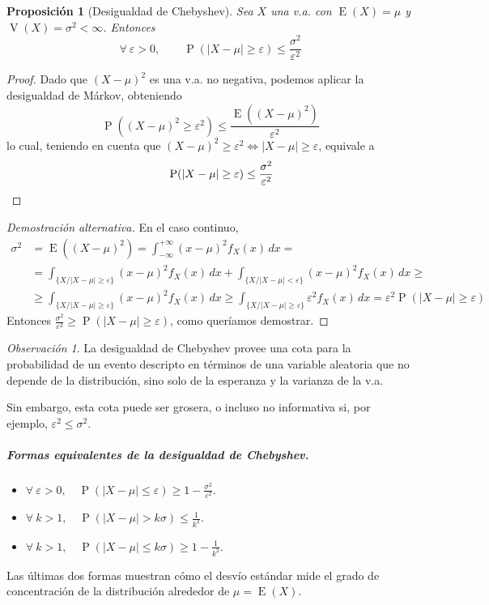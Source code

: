 \documentclass[11pt]{article}
\theoremstyle{plain}
\newtheorem*{pro}{Proposición}
\theoremstyle{definition}
\theoremstyle{remark}
\newtheorem*{obs}{Observación}
\newcommand{\proba}{\ensuremath{\operatorname{P}}}  %
\newcommand{\esp}[0]{\ensuremath{\operatorname{E}}}  %
\newcommand{\var}[0]{\ensuremath{\operatorname{V}}}  %
\newcommand{\foralle}{\ensuremath{\forall \ }}  %
\begin{document}
    \begin{pro}[Desigualdad de Chebyshev]
      Sea $X$ una v.a. con $\esp(X) = \mu$ y $\var(X) = \sigma^2 < \infty$. Entonces
      \[ \foralle \varepsilon > 0, \qquad \proba(\vert X - \mu \vert \geq \varepsilon) \leq \frac{\sigma^2}{\varepsilon^2} \]
    \end{pro}
    \begin{proof}
      Dado que $(X - \mu)^2$ es una v.a. no negativa, podemos aplicar la desigualdad de Márkov, obteniendo
      \[ \proba((X - \mu)^2 \geq \varepsilon^2) \leq \frac{\esp \left((X - \mu)^2 \right)}{\varepsilon^2}\]
      lo cual, teniendo en cuenta que $ (X - \mu)^2 \geq \varepsilon^2 \Leftrightarrow \vert X - \mu \vert \geq \varepsilon $, equivale a
      \[ \qquad \proba(\vert X - \mu \vert \geq \varepsilon) \leq \frac{\sigma^2}{\varepsilon^2} \qedhere \]
    \end{proof}
    \begin{proof} [Demostración alternativa]
      En el caso continuo,
      \[ \begin{split}
        \sigma^2 &= \esp \left( (X - \mu)^2 \right) = \int_{-\infty}^{+\infty} (x - \mu)^2 f_X(x) \,dx = \\
        &= \int_{\lbrace X / \vert X - \mu \vert \geq \varepsilon \rbrace} (x - \mu)^2 f_X(x) \,dx + \int_{\lbrace X / \vert X - \mu \vert < \varepsilon \rbrace} (x - \mu)^2 f_X(x) \,dx \geq \\
        &\geq \int_{\lbrace X / \vert X - \mu \vert \geq \varepsilon \rbrace} (x - \mu)^2 f_X(x) \,dx \geq \int_{\lbrace X / \vert X - \mu \vert \geq \varepsilon \rbrace} \varepsilon^2 f_X(x) \,dx = \varepsilon^2 \proba(\vert X - \mu \vert \geq \varepsilon)
      \end{split} \]
      Entonces $\frac{\sigma^2}{\varepsilon^2} \geq \proba(\vert X - \mu \vert \geq \varepsilon)$, como queríamos demostrar.
    \end{proof}

    \begin{obs}
      La desigualdad de Chebyshev provee una cota para la probabilidad de un evento descripto en términos de una variable aleatoria que no depende de la distribución, sino solo de la esperanza y la varianza de la v.a.

      Sin embargo, esta cota puede ser grosera, o incluso no informativa si, por ejemplo, $\varepsilon^2 \leq \sigma^2$.
    \end{obs}

    \subparagraph{Formas equivalentes de la desigualdad de Chebyshev.}
    \begin{itemize}
      \item $\foralle \varepsilon > 0, \quad \proba(\vert X - \mu \vert \leq \varepsilon) \geq 1 - \frac{\sigma^2}{\varepsilon^2}$.
      \item $\foralle k > 1, \quad \proba(\vert X - \mu \vert > k \sigma) \leq \frac{1}{k^2}$.
      \item $\foralle k > 1, \quad \proba(\vert X - \mu \vert \leq k \sigma) \geq 1 - \frac{1}{k^2}$.
    \end{itemize}
    Las últimas dos formas muestran cómo el desvío estándar mide el grado de concentración de la distribución alrededor de $\mu = \esp(X)$.
\end{document}
